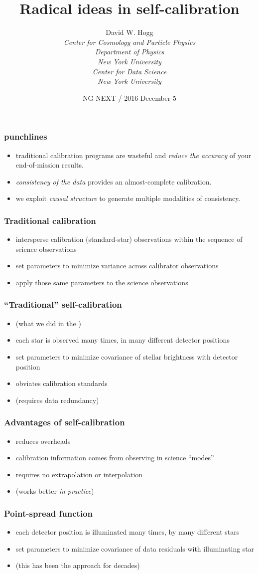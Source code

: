 \documentclass[pdftex]{beamer}
\title{Radical ideas in self-calibration}
\author[David W. Hogg (NYU)]{David W. Hogg \\[1ex]
  \textsl{\small Center for Cosmology and Particle Physics\\
                 Department of Physics\\
                 New York University\\[1ex]
                 Center for Data Science\\
                 New York University}}
\date{NG NEXT / 2016 December 5}
\newcommand{\conclusionslide}{
\begin{frame}
  \frametitle{punchlines}
  \begin{itemize}
  \item traditional calibration programs are wasteful and \emph{reduce the accuracy} of your end-of-mission results.
  \item \emph{consistency of the data} provides an almost-complete calibration.
  \item we exploit \emph{causal structure} to generate multiple modalities of consistency.
  \end{itemize}
\end{frame}
}
\begin{document}
\begin{frame}
  \titlepage
\end{frame}

\conclusionslide

\begin{frame}
  \frametitle{Traditional calibration}
  \begin{itemize}
  \item intersperse calibration (standard-star) observations within the sequence of science observations
  \item set parameters to minimize variance across calibrator observations
  \item apply those same parameters to the science observations
  \end{itemize}
\end{frame}

\begin{frame}
  \frametitle{``Traditional'' self-calibration}
  \begin{itemize}
  \item (what we did in the )
  \item each star is observed many times, in many different detector positions
  \item set parameters to minimize covariance of stellar brightness with detector position
  \item obviates calibration standards
  \item (requires data redundancy)
  \end{itemize}
\end{frame}

\begin{frame}
  \frametitle{Advantages of self-calibration}
  \begin{itemize}
  \item reduces overheads
  \item calibration information comes from observing in science ``modes''
  \item requires no extrapolation or interpolation
  \item (works better \emph{in practice})
  \end{itemize}
\end{frame}

\begin{frame}
  \frametitle{Point-spread function}
  \begin{itemize}
  \item each detector position is illuminated many times, by many different stars
  \item set parameters to minimize covariance of data residuals with illuminating star
  \item (this has been the approach for decades)
  \end{itemize}
\end{frame}
\end{document}
